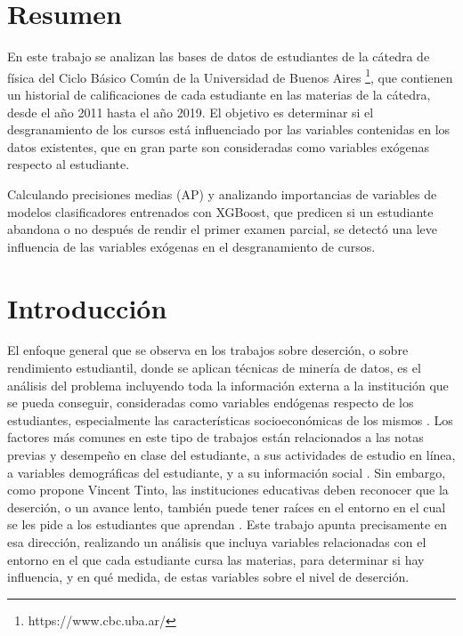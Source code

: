 \documentclass[a4paper,11pt,dvipsnames]{article}
\begin{document}
\newpage
\thispagestyle{fancy}
\tableofcontents

\newpage
{}


\section*{Resumen}
%

En este trabajo se analizan las bases de datos de estudiantes de la cátedra de física del Ciclo Básico Común de la Universidad de Buenos Aires \footnote[1]{https://www.cbc.uba.ar/}, que contienen un historial de calificaciones de cada estudiante en las materias de la cátedra, desde el año 2011 hasta el año 2019. El objetivo es determinar si el desgranamiento de los cursos está influenciado por las variables contenidas en los datos existentes, que en gran parte son consideradas como variables exógenas respecto al estudiante.\par\medskip
Calculando precisiones medias (AP) y analizando importancias de variables de modelos clasificadores entrenados con XGBoost, que predicen si un estudiante abandona o no después de rendir el primer examen parcial, se detectó una leve influencia de las variables exógenas en el desgranamiento de cursos.

\section{Introducción}

El enfoque general que se observa en los trabajos sobre deserción, o sobre rendimiento estudiantil, donde se aplican técnicas de minería de datos, es el análisis del problema incluyendo toda la información externa a la institución que se pueda conseguir, consideradas como variables endógenas respecto de los estudiantes, especialmente las características socioeconómicas de los mismos \cite{GarciaDeFanelli:RAESrendimiento}. Los factores más comunes en este tipo de trabajos están relacionados a las notas previas y desempeño en clase del estudiante, a sus actividades de estudio en línea, a variables demográficas del estudiante, y a su información social \cite{Saa:review}. Sin embargo, como propone Vincent Tinto, las instituciones educativas deben reconocer que la deserción, o un avance lento, también puede tener raíces en el entorno en el cual se les pide a los estudiantes que aprendan \cite{Tinto:firstyear}. Este trabajo apunta precisamente en esa dirección, realizando un análisis que incluya variables relacionadas con el entorno en el que cada estudiante cursa las materias, para determinar si hay influencia, y en qué medida, de estas variables sobre el nivel de deserción.\par\medskip
\end{document}
